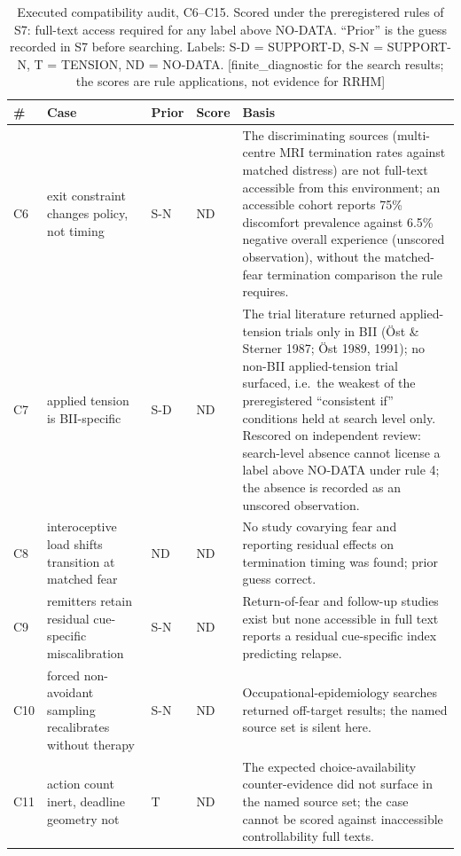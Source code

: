 \documentclass[9pt,twocolumn]{article}
\newcommand{\tier}[1]{{\sffamily\scriptsize\color{RRHMSlate}[#1]}}
\begin{document}
\begin{table}[!t]
\centering
\caption{Executed compatibility audit, C6--C15. Scored under the preregistered rules of S7: full-text access required for any label above NO-DATA. ``Prior'' is the guess recorded in S7 before searching. Labels: S-D = SUPPORT-D, S-N = SUPPORT-N, T = TENSION, ND = NO-DATA. \tier{finite\_diagnostic for the search results; the scores are rule applications, not evidence for RRHM}}
\label{tab:audit}
\small
\begin{tabularx}{\textwidth}{p{}p{}p{}p{}X}
\toprule
\textbf{\#} & \textbf{Case} & \textbf{Prior} & \textbf{Score} & \textbf{Basis} \\
\midrule
C6 & exit constraint changes policy, not timing & S-N & ND & The discriminating sources (multi-centre MRI termination rates against matched distress) are not full-text accessible from this environment; an accessible cohort reports 75\% discomfort prevalence against 6.5\% negative overall experience (unscored observation), without the matched-fear termination comparison the rule requires. \\
C7 & applied tension is BII-specific & S-D & ND & The trial literature returned applied-tension trials only in BII (\"Ost \& Sterner 1987; \"Ost 1989, 1991); no non-BII applied-tension trial surfaced, i.e.\ the weakest of the preregistered ``consistent if'' conditions held at search level only. Rescored on independent review: search-level absence cannot license a label above NO-DATA under rule 4; the absence is recorded as an unscored observation. \\
C8 & interoceptive load shifts transition at matched fear & ND & ND & No study covarying fear and reporting residual effects on termination timing was found; prior guess correct. \\
C9 & remitters retain residual cue-specific miscalibration & S-N & ND & Return-of-fear and follow-up studies exist but none accessible in full text reports a residual cue-specific index predicting relapse. \\
C10 & forced non-avoidant sampling recalibrates without therapy & S-N & ND & Occupational-epidemiology searches returned off-target results; the named source set is silent here. \\
C11 & action count inert, deadline geometry not & T & ND & The expected choice-availability counter-evidence did not surface in the named source set; the case cannot be scored against inaccessible controllability full texts. \\

\end{tabularx}
\end{table}
\end{document}
